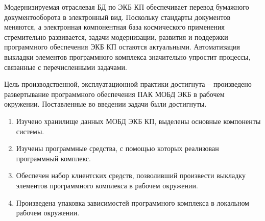 
Модернизируемая отраслевая БД по ЭКБ КП обеспечивает перевод бумажного документооборота в электронный вид. Поскольку стандарты документов меняются, а электронная компонентная база космического применения стремительно развивается, задачи модернизации, развития и поддержки программного обеспечения ЭКБ КП остаются актуальными. Автоматизация выкладки элементов программного комплекса значительно упростит процессы, связанные с перечисленными задачами.

Цель производственной, эксплуатационной практики достигнута -- произведено развертывание программного обеспечения ПАК МОБД ЭКБ в рабочем окружении. Поставленные во введении задачи были достигнуты.
\begin{enumerate}
	\item Изучено хранилище данных МОБД ЭКБ КП, выделены основные компоненты системы.
	\item Изучены программные средства, с помощью которых реализован программный комплекс.
	\item Обеспечен набор клиентских средств, позволивший произвести выкладку элементов программного комплекса в рабочем окружении.
	\item Произведена упаковка зависимостей программного комплекса в локальном рабочем окружении.
\end{enumerate}